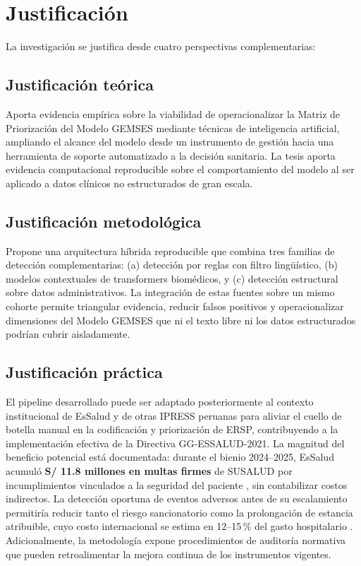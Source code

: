 \section{Justificación}

La investigación se justifica desde cuatro perspectivas complementarias:

\subsection{Justificación teórica}
Aporta evidencia empírica sobre la viabilidad de operacionalizar la Matriz de Priorización del Modelo GEMSES \citep{perez2021gemses} mediante técnicas de inteligencia artificial, ampliando el alcance del modelo desde un instrumento de gestión hacia una herramienta de soporte automatizado a la decisión sanitaria. La tesis aporta evidencia computacional reproducible sobre el comportamiento del modelo al ser aplicado a datos clínicos no estructurados de gran escala.

\subsection{Justificación metodológica}
Propone una arquitectura híbrida reproducible que combina tres familias de detección complementarias: (a) detección por reglas con filtro lingüístico, (b) modelos contextuales de transformers biomédicos, y (c) detección estructural sobre datos administrativos. La integración de estas fuentes sobre un mismo cohorte permite triangular evidencia, reducir falsos positivos y operacionalizar dimensiones del Modelo GEMSES que ni el texto libre ni los datos estructurados podrían cubrir aisladamente.

\subsection{Justificación práctica}
El pipeline desarrollado puede ser adaptado posteriormente al contexto institucional de EsSalud y de otras IPRESS peruanas para aliviar el cuello de botella manual en la codificación y priorización de ERSP, contribuyendo a la implementación efectiva de la Directiva GG-ESSALUD-2021. La magnitud del beneficio potencial está documentada: durante el bienio 2024--2025, EsSalud acumuló \textbf{S/ 11.8 millones en multas firmes} de SUSALUD por incumplimientos vinculados a la seguridad del paciente \citep{susalud2024multas}, sin contabilizar costos indirectos. La detección oportuna de eventos adversos antes de su escalamiento permitiría reducir tanto el riesgo sancionatorio como la prolongación de estancia atribuible, cuyo costo internacional se estima en 12--15\,\% del gasto hospitalario \citep{oecd2017economics}. Adicionalmente, la metodología expone procedimientos de auditoría normativa que pueden retroalimentar la mejora continua de los instrumentos vigentes.

